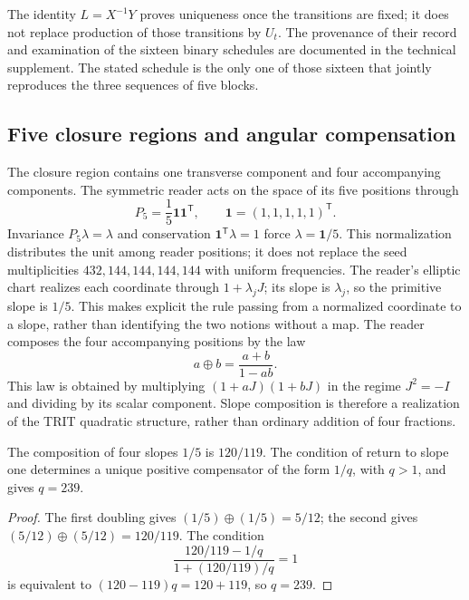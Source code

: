 The identity \(L=X^{-1}Y\) proves uniqueness once the transitions are fixed; it does not replace production of those transitions by \(U_t\). The provenance of their record and examination of the sixteen binary schedules are documented in the technical supplement. The stated schedule is the only one of those sixteen that jointly reproduces the three sequences of five blocks.



\subsection{Five closure regions and angular compensation}

The closure region contains one transverse component and four accompanying components. The symmetric reader acts on the space of its five positions through
\[
 P_5=\frac15\mathbf1\mathbf1^{\mathsf T},\qquad
 \mathbf1=(1,1,1,1,1)^{\mathsf T}.
\]
Invariance \(P_5\lambda=\lambda\) and conservation \(\mathbf1^{\mathsf T}\lambda=1\) force \(\lambda=\mathbf1/5\). This normalization distributes the unit among reader positions; it does not replace the seed multiplicities \(432,144,144,144,144\) with uniform frequencies. The reader's elliptic chart realizes each coordinate through \(1+\lambda_jJ\); its slope is \(\lambda_j\), so the primitive slope is \(1/5\). This makes explicit the rule passing from a normalized coordinate to a slope, rather than identifying the two notions without a map. The reader composes the four accompanying positions by the law
\begin{equation}
 a\oplus b=\frac{a+b}{1-ab}.
 \label{eq:suma-pendientes}
\end{equation}
This law is obtained by multiplying \((1+aJ)(1+bJ)\) in the regime \(J^2=-I\) and dividing by its scalar component. Slope composition is therefore a realization of the TRIT quadratic structure, rather than ordinary addition of four fractions.

\begin{proposition}
The composition of four slopes \(1/5\) is \(120/119\). The condition of return to slope one determines a unique positive compensator of the form \(1/q\), with \(q>1\), and gives \(q=239\).
\end{proposition}
\begin{proof}
The first doubling gives \((1/5)\oplus(1/5)=5/12\); the second gives \((5/12)\oplus(5/12)=120/119\). The condition
\[
 \frac{120/119-1/q}{1+(120/119)/q}=1
\]
is equivalent to \((120-119)q=120+119\), so \(q=239\).
\end{proof}

